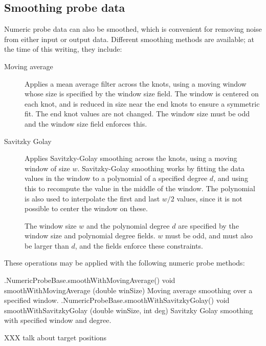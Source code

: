 \subsection{Smoothing probe data}
\label{SmoothingProbeData:sec}

Numeric probe data can also be smoothed, which is convenient for removing noise
from either input or output data. Different smoothing methods are available; at
the time of this writing, they include:

\begin{description}

\item[Moving average] \mbox{}

Applies a mean average filter across the knots, using a moving window
whose size is specified by the {\sf window size} field. The window is
centered on each knot, and is reduced in size near the end knots to
ensure a symmetric fit. The end knot values are not changed.  The
window size must be odd and the {\sf window size} field enforces this.

\item[Savitzky Golay] \mbox{}

Applies Savitzky-Golay smoothing across the knots, using a moving
window of size $w$.  Savitzky-Golay smoothing works by fitting the
data values in the window to a polynomial of a specified degree $d$, and
using this to recompute the value in the middle of the window.  The
polynomial is also used to interpolate the first and last $w/2$
values, since it is not possible to center the window on these.

The window size $w$ and the polynomial degree $d$ are specified by the
{\sf window size} and {\sf polynomial degree} fields. $w$ must be odd,
and must also be larger than $d$, and the fields enforce these
constraints.

\end{description}

These operations may be applied with the following numeric probe
methods:

%
\begin{methodtable}{0.5}{0.5}
\midline
%
\methodentry
{\probes.NumericProbeBase.smoothWithMovingAverage()}%
{void smoothWithMovingAverage (double winSize)}%
{Moving average smoothing over a specified window.}%
%
\methodentry
{\probes.NumericProbeBase.smoothWithSavitzkyGolay()}%
{void smoothWithSavitzkyGolay (\brh double winSize, int deg)}%
{Savitzky Golay smoothing with specified window and degree.}%
%
\midline
\end{methodtable}
%

%
\ifdefined\maindoc
\else

\fi

XXX talk about target positions
